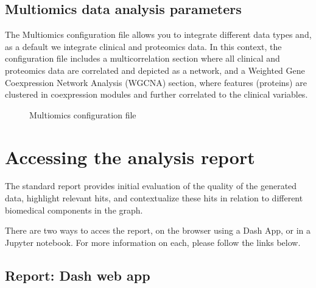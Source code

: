 \documentclass[letterpaper,10pt,english]{sphinxmanual}
\let\sphinxpxdimen\pdfpxdimen\else\newdimen\sphinxpxdimen
\begin{document}
\subsection{Multiomics data analysis parameters}
\label{\detokenize{getting_started/data_settings/multiomics:multiomics-data-analysis-parameters}}\label{\detokenize{getting_started/data_settings/multiomics:multiomics-data-conf-file}}\label{\detokenize{getting_started/data_settings/multiomics::doc}}
The Multiomics configuration file allows you to integrate different data types and, as a default we integrate clinical and proteomics data.
In this context, the configuration file includes a multi\sphinxhyphen{}correlation section where all clinical and proteomics data are correlated and depicted as a network, and a Weighted Gene Co\sphinxhyphen{}expression Network Analysis (WGCNA) section, where features (proteins) are clustered in co\sphinxhyphen{}expression modules and further correlated to the clinical variables.
\begin{wrapfigure}{r}{350\sphinxpxdimen}
\centering
\noindent\sphinxincludegraphics[width=350\sphinxpxdimen]{{multiomics_config}.png}
\caption{Multiomics configuration file}\label{\detokenize{getting_started/data_settings/multiomics:id1}}\end{wrapfigure}


\section{Accessing the analysis report}
\label{\detokenize{getting_started/access-report:accessing-the-analysis-report}}\label{\detokenize{getting_started/access-report::doc}}
The standard report provides initial evaluation of the quality of the generated data, highlight relevant hits, and contextualize these hits in relation to different biomedical components in the graph.

There are two ways to acces the report, on the browser using a Dash App, or in a Jupyter notebook. For more information on each, please follow the links below.


\subsection{Report: Dash web app}
\label{\detokenize{getting_started/report_access/dash-app:report-dash-web-app}}\label{\detokenize{getting_started/report_access/dash-app::doc}}
\end{document}
